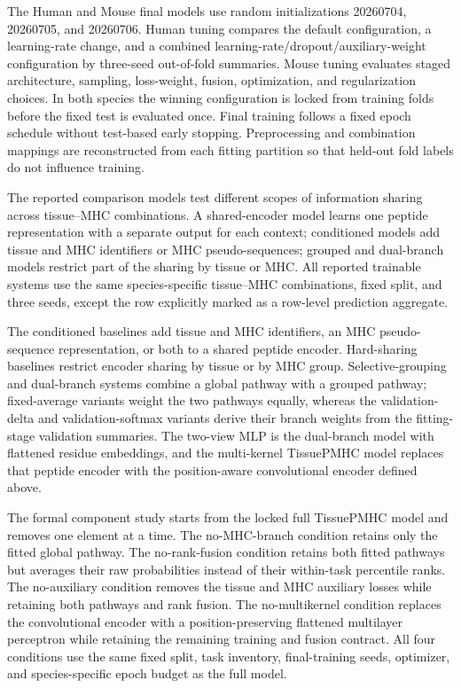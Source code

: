 The Human and Mouse final models use random initializations 20260704, 20260705, and 20260706. Human tuning compares the default configuration, a learning-rate change, and a combined learning-rate/dropout/auxiliary-weight configuration by three-seed out-of-fold summaries. Mouse tuning evaluates staged architecture, sampling, loss-weight, fusion, optimization, and regularization choices. In both species the winning configuration is locked from training folds before the fixed test is evaluated once. Final training follows a fixed epoch schedule without test-based early stopping. Preprocessing and combination mappings are reconstructed from each fitting partition so that held-out fold labels do not influence training.

The reported comparison models test different scopes of information sharing across tissue--MHC combinations. A shared-encoder model learns one peptide representation with a separate output for each context; conditioned models add tissue and MHC identifiers or MHC pseudo-sequences; grouped and dual-branch models restrict part of the sharing by tissue or MHC. All reported trainable systems use the same species-specific tissue--MHC combinations, fixed split, and three seeds, except the row explicitly marked as a row-level prediction aggregate.

The conditioned baselines add tissue and MHC identifiers, an MHC pseudo-sequence representation, or both to a shared peptide encoder. Hard-sharing baselines restrict encoder sharing by tissue or by MHC group. Selective-grouping and dual-branch systems combine a global pathway with a grouped pathway; fixed-average variants weight the two pathways equally, whereas the validation-delta and validation-softmax variants derive their branch weights from the fitting-stage validation summaries. The two-view MLP is the dual-branch model with flattened residue embeddings, and the multi-kernel TissuePMHC model replaces that peptide encoder with the position-aware convolutional encoder defined above.

The formal component study starts from the locked full TissuePMHC model and removes one element at a time. The no-MHC-branch condition retains only the fitted global pathway. The no-rank-fusion condition retains both fitted pathways but averages their raw probabilities instead of their within-task percentile ranks. The no-auxiliary condition removes the tissue and MHC auxiliary losses while retaining both pathways and rank fusion. The no-multikernel condition replaces the convolutional encoder with a position-preserving flattened multilayer perceptron while retaining the remaining training and fusion contract. All four conditions use the same fixed split, task inventory, final-training seeds, optimizer, and species-specific epoch budget as the full model.

